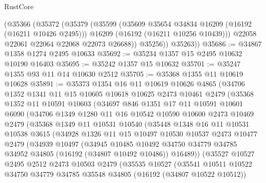 \begin{lexlean}{RustCore}
\begin{coremodule}
          (@35366
            (@35372
              (@35379
                (@35599
                  (@35609 @35654 @34834 @16209 (@16192 (@16211 @10426 @2495)))
                  @16209
                  (@16192 (@16211 @10256 @10439)))
                @22058
                @22061
                @22064
                @22068
                @22073
                @26688))
            @35256))
        @35263))
@35686 := @34867 @1358 @1274 @2495 @10633
@35692 := @35234 @1357 @15 @2495 @10632 @10190 @16403
@35695 := @35242 @1357 @15 @10632
@35701 := @35247 @1355 @93 @11 @14 @10630 @2512
@35705 := @35368 @1355 @11 @10619 @10628
@35891 := @35373
    @1354
    @16
    @11
    @10619
    @10626
    @4865
    (@34706
      @1352
      @1341
      @11
      @15
      @10605
      @10618
      @10625
      @2473
      @10461
      @2479
      (@35368
        @1352
        @11
        @10591
        @10603
        (@34697
          @846
          @1351
          @17
          @11
          @10591
          @10601
          @6090
          (@34706
            @1349
            @1280
            @11
            @16
            @10542
            @10590
            @10600
            @2473
            @10469
            @2479
            (@35368
              @1349
              @11
              @10531
              @10540
              (@35448
                @1348
                @16
                @11
                @10531
                @10538
                @3615
                (@34928
                  @1326
                  @11
                  @15
                  @10497
                  @10530
                  @10537
                  @2473
                  @10477
                  @2479
                  (@34939
                    @10497
                    (@34945
                      @10485
                      @10492
                      @34750
                      @34779
                      @34785
                      @34952
                      @34805
                      (@16192 (@34807 @10492 @10486))
                      @16489))
                  (@35527
                    @10527
                    @2495
                    @2512
                    @2473
                    @10503
                    @2479
                    (@35535
                      @10527
                      (@35541
                        @10511
                        @10522
                        @34750
                        @34779
                        @34785
                        @35548
                        @34805
                        (@16192 (@34807 @10522 @10512))

\end{coremodule}
\end{lexlean}
